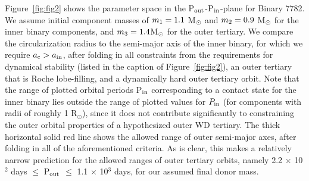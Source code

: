 \documentclass{aastex62}
\begin{document}
Figure~\ref{fig:fig2} shows the parameter space in the P$_{\rm
  out}$-P$_{\rm in}$-plane for Binary 7782.  We assume initial
component masses of $m_{\rm 1} = 1.1$ M$_{\rm \odot}$ and $m_{\rm 2}
= 0.9$ M$_{\rm \odot}$ for the inner binary components, and $m_{\rm 3}
= 1.4 $M$_{\rm \odot}$ for the outer tertiary.  We compare the
circularization radius to the semi-major axis of the inner binary, for
which we require $a_{\rm c} > a_{\rm in}$, after folding in all
constraints from the requirements for dynamical stability (listed in
the caption of Figure~\ref{fig:fig2}), an outer tertiary that is Roche
lobe-filling, and a dynamically hard outer tertiary orbit.  Note that
the range of plotted orbital periods P$_{\rm in}$ corresponding to a
contact state for the inner binary lies outside the range of plotted
values for $P_{\rm in}$ (for components with radii of roughly 1
R$_{\odot}$), since it does not contribute significantly to
constraining the outer orbital properties of a hypothesized outer WD
tertiary.  The thick horizontal solid red line shows the allowed range
of outer semi-major axes, after folding in all of the aforementioned
criteria.  As is clear, this makes a relatively narrow prediction for
the allowed ranges of outer tertiary orbits, namely 2.2 $\times$
10$^{2}$ days $\le$ P$_{\rm out}$ $\le$ 1.1 $\times$ 10$^3$ days, for
our assumed final donor mass.
\end{document}

